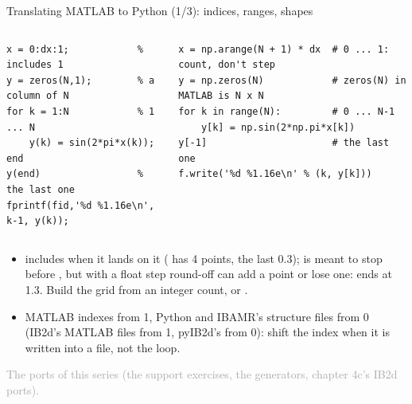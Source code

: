 \documentclass[aspectratio=169,11pt]{beamer}
\newcommand{\sourcecredit}[1]{\vfill\begin{flushright}\tiny\textcolor{DarkGray}{#1}\end{flushright}}
\begin{document}
\begin{frame}[fragile]{Translating MATLAB to Python (1/3): indices, ranges, shapes}
\label{fr:trans1}
\begin{columns}[T,onlytextwidth]
\begin{lstlisting}[style=matlab,basicstyle=\ttfamily\fontsize{7.5}{9}\selectfont\color{BlackGray}]
x = 0:dx:1;            % includes 1
y = zeros(N,1);        % a column of N
for k = 1:N            % 1 ... N
    y(k) = sin(2*pi*x(k));
end
y(end)                 % the last one
fprintf(fid,'%d %1.16e\n', k-1, y(k));
\end{lstlisting}
\begin{lstlisting}[style=python,basicstyle=\ttfamily\fontsize{7.5}{9}\selectfont\color{BlackGray}]
x = np.arange(N + 1) * dx  # 0 ... 1: count, don't step
y = np.zeros(N)            # zeros(N) in MATLAB is N x N
for k in range(N):         # 0 ... N-1
    y[k] = np.sin(2*np.pi*x[k])
y[-1]                      # the last one
f.write('%d %1.16e\n' % (k, y[k]))
\end{lstlisting}
\end{columns}
\footnotesize
\begin{itemize}\setlength{\itemsep}{1pt}
  \item {} includes  when it lands on it ( has 4 points, the last 0.3);  is meant to stop before , but with a float step round-off can add a point or lose one:  ends at 1.3. Build the grid from an integer count,  or .
  \item MATLAB indexes from 1, Python and IBAMR's structure files from 0 (IB2d's MATLAB files from 1, pyIB2d's from 0): shift the index when it is written into a file, not the loop.
\end{itemize}
\sourcecredit{The ports of this series (the support exercises, the generators, chapter 4c's IB2d ports).}
\end{frame}
\end{document}
